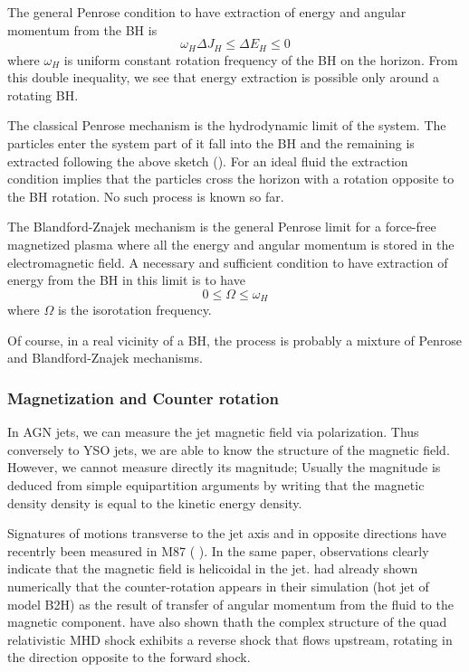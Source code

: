 \documentclass[10pt,a4paper,english]{article}
\begin{document}
The general Penrose condition to have extraction of energy and angular momentum
from the BH is
\begin{equation}
    \omega_H \Delta J_H \leq \Delta E_H \leq 0
\end{equation}
where $\omega_H$ is uniform constant rotation frequency of the BH on the
horizon. From this double inequality, we see that energy extraction is possible
only around a rotating BH.  

The classical Penrose mechanism is the hydrodynamic limit of the system. The
particles enter the system part of it fall into the BH and the remaining is
extracted following the above sketch (). For an ideal fluid the
extraction condition implies that the particles cross the horizon with a
rotation opposite to the BH rotation. No such process is known so far.

The Blandford-Znajek mechanism is the general Penrose limit for a force-free
magnetized plasma where all the energy and angular momentum is stored in the
electromagnetic field. A necessary and sufficient condition to have extraction
of energy from the BH in this limit is to have
\begin{equation}
  0 \leq \Omega \leq \omega_H
\end{equation}
where $\Omega$ is the isorotation frequency.

Of course, in a real vicinity of a BH, the process is probably a mixture of
Penrose and Blandford-Znajek mechanisms.

\subsubsection{Magnetization and Counter rotation}

In AGN jets, we can measure the jet magnetic field via polarization. Thus
conversely to YSO jets, we are able to know the structure of the magnetic
field. However, we cannot measure directly its magnitude; Usually the magnitude
is deduced from simple equipartition arguments by writing that the magnetic
density density is equal to the kinetic energy density.

Signatures of motions transverse to the jet axis and in opposite directions
have recentrly been measured in M87 (\cite{2013ApJ...774L..21M} ). In the same paper, observations clearly indicate that the magnetic field
is helicoidal in the jet. \cite{2009MNRAS.394.1182K} had already shown
numerically that the counter-rotation appears in their simulation (hot jet of
model B2H) as the result of transfer of angular momentum from the fluid to the
magnetic component. \cite{2010ApJ...721.1783N} have also shown thath the
complex structure of the quad relativistic MHD shock exhibits a reverse shock
that flows upstream, rotating in the direction opposite to the forward shock.
\end{document}
